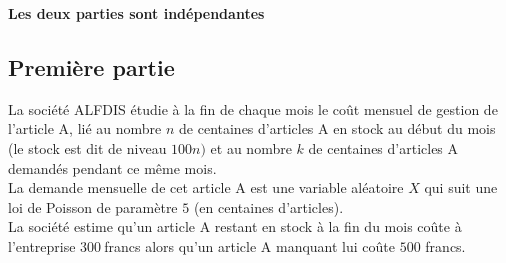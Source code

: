 \documentclass[11pt]{article}%
\begin{document}
\begin{center}
\textbf{Les deux parties sont indépendantes}
\end{center}

\subsection*{Première partie}

La société ALFDIS étudie à la fin de chaque mois le coût mensuel de
gestion
de l'article A, lié au nombre $n$ de centaines d'articles A en stock au
début du mois (le stock est dit de niveau $100n)$ et au nombre $k$ de
centaines d'articles A demandés pendant ce même mois.\\
La demande mensuelle de cet article A est une variable aléatoire $X$
qui
suit une loi de Poisson de paramètre $5$ (en centaines d'articles).\\
La société estime qu'un article A restant en stock à la fin du mois
coûte à
l'entreprise $300\ $francs alors qu'un article A manquant lui coûte
$500$
francs.
\end{document}
